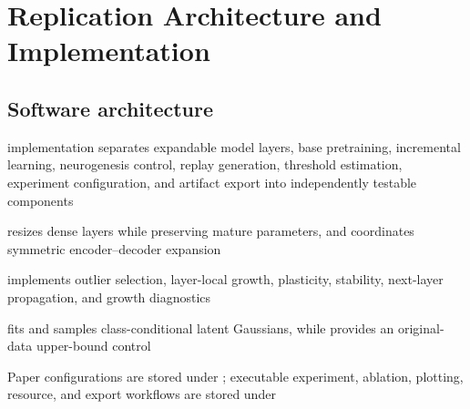 \section{Replication Architecture and Implementation}

\subsection{Software architecture}
\begin{draftpoints}
  \item implementation separates expandable model layers, base pretraining, incremental learning, neurogenesis control, replay generation, threshold estimation, experiment configuration, and artifact export into independently testable components
  \item {} resizes dense layers while preserving mature parameters, and  coordinates symmetric encoder--decoder expansion
  \item {} implements outlier selection, layer-local growth, plasticity, stability, next-layer propagation, and growth diagnostics
  \item {} fits and samples class-conditional latent Gaussians, while  provides an original-data upper-bound control
  \item Paper configurations are stored under ; executable experiment, ablation, plotting, resource, and export workflows are stored under 
\end{draftpoints}

